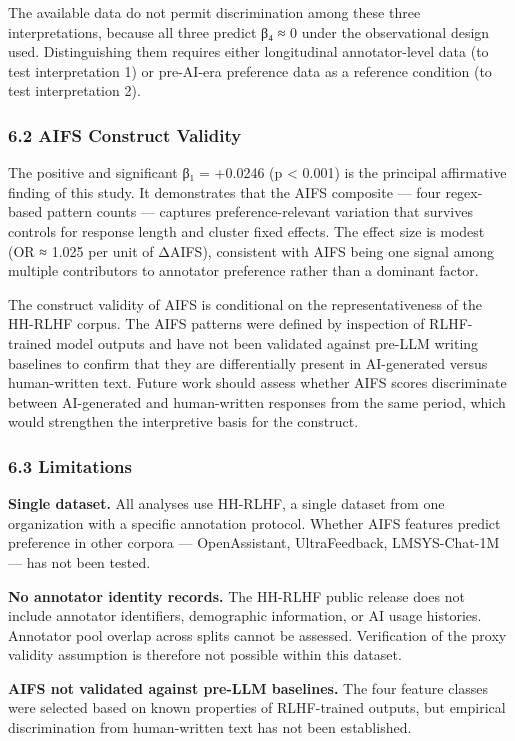 The available data do not permit discrimination among these three interpretations, because all three predict β₄ ≈ 0 under the observational design used. Distinguishing them requires either longitudinal annotator-level data (to test interpretation 1) or pre-AI-era preference data as a reference condition (to test interpretation 2).

\subsubsection{6.2 AIFS Construct Validity}

The positive and significant β₁ = +0.0246 (p < 0.001) is the principal affirmative finding of this study. It demonstrates that the AIFS composite — four regex-based pattern counts — captures preference-relevant variation that survives controls for response length and cluster fixed effects. The effect size is modest (OR ≈ 1.025 per unit of ΔAIFS), consistent with AIFS being one signal among multiple contributors to annotator preference rather than a dominant factor.

The construct validity of AIFS is conditional on the representativeness of the HH-RLHF corpus. The AIFS patterns were defined by inspection of RLHF-trained model outputs and have not been validated against pre-LLM writing baselines to confirm that they are differentially present in AI-generated versus human-written text. Future work should assess whether AIFS scores discriminate between AI-generated and human-written responses from the same period, which would strengthen the interpretive basis for the construct.

\subsubsection{6.3 Limitations}

\textbf{Single dataset.} All analyses use HH-RLHF, a single dataset from one organization with a specific annotation protocol. Whether AIFS features predict preference in other corpora — OpenAssistant, UltraFeedback, LMSYS-Chat-1M — has not been tested.

\textbf{No annotator identity records.} The HH-RLHF public release does not include annotator identifiers, demographic information, or AI usage histories. Annotator pool overlap across splits cannot be assessed. Verification of the proxy validity assumption is therefore not possible within this dataset.

\textbf{AIFS not validated against pre-LLM baselines.} The four feature classes were selected based on known properties of RLHF-trained outputs, but empirical discrimination from human-written text has not been established.

